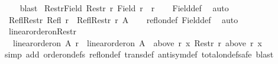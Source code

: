 \begin{isabellebody}
%
\isadelimproof
\ \ %
\endisadelimproof
%
\isatagproof
{}\isamarkupfalse%
\ blast%
\endisatagproof
{\isafoldproof}%
%
\isadelimproof
\isanewline
%
\endisadelimproof
\isanewline
{}\isamarkupfalse%
\ Restr{\isacharunderscore}{\kern0pt}Field{\isacharcolon}{\kern0pt}\ {\isachardoublequoteopen}Restr\ r\ {\isacharparenleft}{\kern0pt}Field\ r{\isacharparenright}{\kern0pt}\ {\isacharequal}{\kern0pt}\ r{\isachardoublequoteclose}\isanewline
%
\isadelimproof
\ \ %
\endisadelimproof
%
\isatagproof
{}\isamarkupfalse%
\ Field{\isacharunderscore}{\kern0pt}def\ \isamarkupfalse%
\ auto%
\endisatagproof
{\isafoldproof}%
%
\isadelimproof
\isanewline
%
\endisadelimproof
\isanewline
{}\isamarkupfalse%
\ Refl{\isacharunderscore}{\kern0pt}Restr{\isacharcolon}{\kern0pt}\ {\isachardoublequoteopen}Refl\ r\ {\isasymLongrightarrow}\ Refl{\isacharparenleft}{\kern0pt}Restr\ r\ A{\isacharparenright}{\kern0pt}{\isachardoublequoteclose}\isanewline
%
\isadelimproof
\ \ %
\endisadelimproof
%
\isatagproof
{}\isamarkupfalse%
\ refl{\isacharunderscore}{\kern0pt}on{\isacharunderscore}{\kern0pt}def\ Field{\isacharunderscore}{\kern0pt}def\ \isamarkupfalse%
\ auto%
\endisatagproof
{\isafoldproof}%
%
\isadelimproof
\isanewline
%
\endisadelimproof
\isanewline
{}\isamarkupfalse%
\ linear{\isacharunderscore}{\kern0pt}order{\isacharunderscore}{\kern0pt}on{\isacharunderscore}{\kern0pt}Restr{\isacharcolon}{\kern0pt}\isanewline
\ \ {\isachardoublequoteopen}linear{\isacharunderscore}{\kern0pt}order{\isacharunderscore}{\kern0pt}on\ A\ r\ {\isasymLongrightarrow}\ linear{\isacharunderscore}{\kern0pt}order{\isacharunderscore}{\kern0pt}on\ {\isacharparenleft}{\kern0pt}A\ {\isasyminter}\ above\ r\ x{\isacharparenright}{\kern0pt}\ {\isacharparenleft}{\kern0pt}Restr\ r\ {\isacharparenleft}{\kern0pt}above\ r\ x{\isacharparenright}{\kern0pt}{\isacharparenright}{\kern0pt}{\isachardoublequoteclose}\isanewline
%
\isadelimproof
\ \ %
\endisadelimproof
%
\isatagproof
{}\isamarkupfalse%
{\isacharparenleft}{\kern0pt}simp\ add{\isacharcolon}{\kern0pt}\ order{\isacharunderscore}{\kern0pt}on{\isacharunderscore}{\kern0pt}defs\ refl{\isacharunderscore}{\kern0pt}on{\isacharunderscore}{\kern0pt}def\ trans{\isacharunderscore}{\kern0pt}def\ antisym{\isacharunderscore}{\kern0pt}def\ total{\isacharunderscore}{\kern0pt}on{\isacharunderscore}{\kern0pt}def{\isacharparenright}{\kern0pt}{\isacharparenleft}{\kern0pt}safe{\isacharsemicolon}{\kern0pt}\ blast{\isacharparenright}{\kern0pt}%
\endisatagproof

\end{isabellebody}
